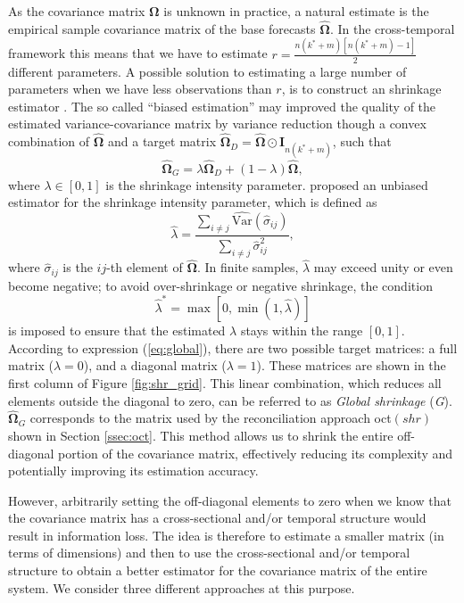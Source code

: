\documentclass[a4paper,11pt]{article}
\newcommand{\Ivet}{\bm{I}}
\newcommand{\Omegavet}{\bm{\Omega}}
\theoremstyle{definition}
\begin{document}
As the covariance matrix $\Omegavet$ is unknown in practice, a natural estimate is the empirical sample covariance matrix of the base forecasts $\widehat{\Omegavet}$. In the cross-temporal framework this means that we have to estimate $r = \displaystyle\frac{n(k^\ast+m)[n(k^\ast+m)-1]}{2}$ different parameters. A possible solution to estimating a large number of parameters when we have less observations than $r$, is to construct an shrinkage estimator \citep{efron1975a,efron1975,efron1977}. The so called “biased estimation” may improved the quality of the estimated variance-covariance matrix by variance reduction though a convex combination of $\widehat{\Omegavet}$ and a target matrix $\widehat{\Omegavet}_D = \widehat{\Omegavet} \odot \Ivet_{n(k^\ast+m)}$, such that 
\begin{equation}\label{eq:global}
\widehat{\Omegavet}_{G} = \lambda \widehat{\Omegavet}_D + (1-\lambda) \widehat{\Omegavet},
\end{equation}
where $\lambda \in [0,1]$ is the shrinkage intensity parameter. 
\cite{schafer2005} proposed an unbiased estimator for the shrinkage intensity parameter, which is defined as
$$
\widehat{\lambda}=\frac{\sum_{i \neq j} \widehat{\mathrm{Var}}(\widehat{\sigma}_{i j})}{\sum_{i \neq j} \widehat{\sigma}_{i j}^2},
$$
where $\widehat{\sigma}_{i j}$ is the $i j$-th element of $\widehat{\Omegavet}$. In finite samples, $\widehat{\lambda}$ may exceed unity or even become negative; to avoid over-shrinkage or negative shrinkage, the condition
$$
\widehat{\lambda}^\ast=\max \left[0, \min \left(1, \widehat{\lambda}\right)\right]
$$
is imposed to ensure that the estimated $\lambda$ stays within the range $[0,1]$. According to expression (\ref{eq:global}), there are two possible target matrices: a full matrix ($\lambda=0$), and a diagonal matrix ($\lambda=1$). These matrices are shown in the first column of Figure \ref{fig:shr_grid}. This linear combination, which reduces all elements outside the diagonal to zero, can be referred to as \textit{Global shrinkage} (\textit{G}). $\widehat{\Omegavet}_{G}$ corresponds to the matrix used by the reconciliation approach oct$(shr)$ shown in Section \ref{ssec:oct}. This method allows us to shrink the entire off-diagonal portion of the covariance matrix, effectively reducing its complexity and potentially improving its estimation accuracy.

However, arbitrarily setting the off-diagonal elements to zero when we know that the covariance matrix has a cross-sectional and/or temporal structure would result in information loss. The idea is therefore to estimate a smaller matrix (in terms of dimensions) and then to use the cross-sectional and/or temporal structure to obtain a better estimator for the covariance matrix of the entire system. We consider three different approaches at this purpose.
\end{document}
